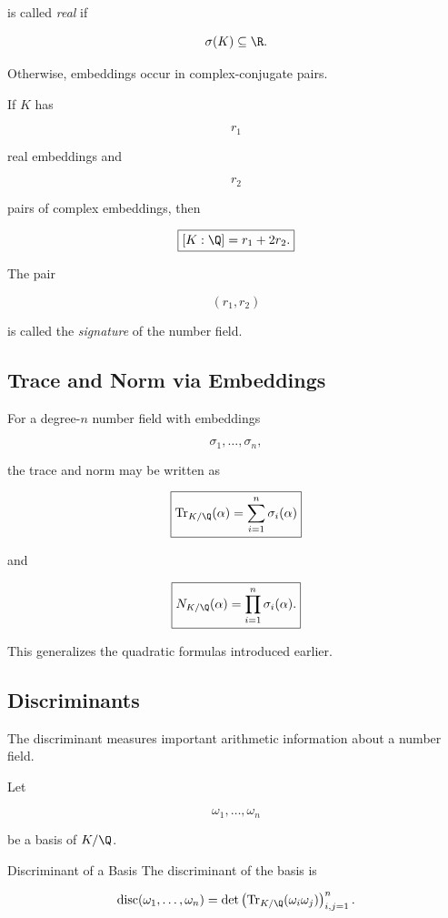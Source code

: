 is called \emph{real} if

\[ \sigma(K)\subseteq\R. \]

Otherwise, embeddings occur in complex-conjugate pairs.

If \(K\) has

\[ r_1 \]

real embeddings and

\[ r_2 \]

pairs of complex embeddings, then

\[ \boxed{[K:\Q]=r_1+2r_2.} \]

The pair

\[ (r_1,r_2) \]

is called the \emph{signature} of the number field.

\subsection{Trace and Norm via Embeddings}
\label{subsec:trace-norm-embeddings}

For a degree-\(n\) number field with embeddings

\[ \sigma_1,\ldots,\sigma_n, \]

the trace and norm may be written as

\[ \boxed{\operatorname{Tr}_{K/\Q}(\alpha)=\sum_{i=1}^{n}\sigma_i(\alpha)} \]

and

\[ \boxed{N_{K/\Q}(\alpha)=\prod_{i=1}^{n}\sigma_i(\alpha).} \]

This generalizes the quadratic formulas introduced earlier.

\subsection{Discriminants}
\label{subsec:number-field-discriminants}

The discriminant measures important arithmetic information about a number
field.

Let

\[ \omega_1,\ldots,\omega_n \]

be a basis of \(K/\Q\).

\begin{definitionbox}{Discriminant of a Basis}
The discriminant of the basis is

\[
\operatorname{disc}(\omega_1,\ldots,\omega_n)
=
\det\left(
\operatorname{Tr}_{K/\Q}(\omega_i\omega_j)
\right)_{i,j=1}^{n}.
\]
\end{definitionbox}


